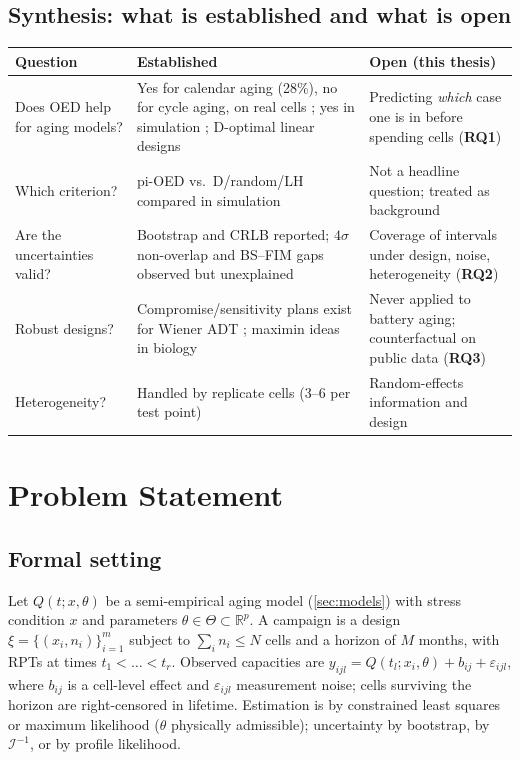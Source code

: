 \documentclass[11pt,letterpaper]{article}
\newcommand{\RQ}[1]{\textbf{RQ#1}}
\begin{document}
\subsection{Synthesis: what is established and what is open}
\begin{tabularx}{\textwidth}{@{}p{4.6cm} L L@{}}
\toprule
\textbf{Question} & \textbf{Established} & \textbf{Open (this thesis)} \\
\midrule
Does OED help for aging models? & Yes for calendar aging (28\%), no for cycle aging, on real cells \cite{stroebl2026}; yes in simulation \cite{palm2022}; D-optimal linear designs \cite{forman2012,mathieu2017} & Predicting \emph{which} case one is in before spending cells (\RQ1) \\
Which criterion? & pi-OED vs.\ D/random/LH compared in simulation \cite{palm2022} & Not a headline question; treated as background \\
Are the uncertainties valid? & Bootstrap and CRLB reported; $4\sigma$ non-overlap and BS--FIM gaps observed but unexplained \cite{stroebl2026} & Coverage of intervals under design, noise, heterogeneity (\RQ2) \\
Robust designs? & Compromise/sensitivity plans exist for Wiener ADT \cite{limyum2011}; maximin ideas in biology \cite{white2016} & Never applied to battery aging; counterfactual on public data (\RQ3) \\
Heterogeneity? & Handled by replicate cells (3--6 per test point) \cite{stroebl2024} & Random-effects information and design \\
\bottomrule
\end{tabularx}

\section{Problem Statement}\label{sec:problem}

\subsection{Formal setting}
Let $Q(t;x,\theta)$ be a semi-empirical aging model (\cref{sec:models}) with stress condition $x$ and parameters $\theta\in\Theta\subset\mathbb R^p$. A campaign is a design $\xi=\{(x_i,n_i)\}_{i=1}^m$ subject to $\sum_i n_i\le N$ cells and a horizon of $M$ months, with RPTs at times $t_1<\dots<t_r$. Observed capacities are $y_{ijl}=Q(t_l;x_i,\theta)+b_{ij}+\varepsilon_{ijl}$, where $b_{ij}$ is a cell-level effect and $\varepsilon_{ijl}$ measurement noise; cells surviving the horizon are right-censored in lifetime. Estimation is by constrained least squares or maximum likelihood ($\theta$ physically admissible); uncertainty by bootstrap, by $\mathcal I^{-1}$, or by profile likelihood.
\end{document}
